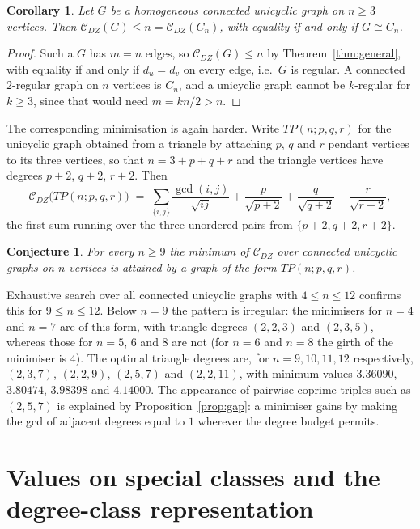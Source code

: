 \documentclass[11pt,a4paper]{article}
\theoremstyle{plain}
\newtheorem{corollary}[theorem]{Corollary}
\newtheorem{conjecture}[theorem]{Conjecture}
\theoremstyle{definition}
\theoremstyle{remark}
\newcommand{\CDZ}{\mathcal{C}_{DZ}}
\newcommand{\gcdd}{\operatorname{gcd}}
\begin{document}
\begin{corollary}
\label{cor:unicyclic}
Let $G$ be a homogeneous connected unicyclic graph on $n\ge3$ vertices. Then
$\CDZ(G)\le n=\CDZ(C_n)$, with equality if and only if $G\cong C_n$.
\end{corollary}

\begin{proof}
Such a $G$ has $m=n$ edges, so $\CDZ(G)\le n$ by Theorem~\ref{thm:general}, with
equality if and only if $d_u=d_v$ on every edge, i.e.\ $G$ is regular. A
connected $2$-regular graph on $n$ vertices is $C_n$, and a unicyclic graph
cannot be $k$-regular for $k\ge3$, since that would need $m=kn/2>n$.
\end{proof}

The corresponding minimisation is again harder. Write $T\!P(n;p,q,r)$ for the
unicyclic graph obtained from a triangle by attaching $p$, $q$ and $r$ pendant
vertices to its three vertices, so that $n=3+p+q+r$ and the triangle vertices
have degrees $p+2$, $q+2$, $r+2$. Then
\[
  \CDZ\bigl(T\!P(n;p,q,r)\bigr)
  \;=\;\sum_{\{i,j\}}\frac{\gcdd(i,j)}{\sqrt{ij}}
  +\frac{p}{\sqrt{p+2}}+\frac{q}{\sqrt{q+2}}+\frac{r}{\sqrt{r+2}},
\]
the first sum running over the three unordered pairs from $\{p+2,q+2,r+2\}$.

\begin{conjecture}
\label{conj:unicyclic}
For every $n\ge9$ the minimum of $\CDZ$ over connected unicyclic graphs on $n$
vertices is attained by a graph of the form $T\!P(n;p,q,r)$.
\end{conjecture}

Exhaustive search over all connected unicyclic graphs with $4\le n\le12$ confirms
this for $9\le n\le12$. Below $n=9$ the pattern is irregular: the minimisers
for $n=4$ and $n=7$ are of this form, with triangle degrees $(2,2,3)$ and
$(2,3,5)$, whereas those for $n=5$, $6$ and $8$ are not (for $n=6$ and $n=8$ the
girth of the minimiser is $4$). The optimal
triangle degrees are, for $n=9,10,11,12$ respectively, $(2,3,7)$, $(2,2,9)$,
$(2,5,7)$ and $(2,2,11)$, with minimum values $3.36090$, $3.80474$, $3.98398$
and $4.14000$. The appearance of pairwise coprime triples such as $(2,5,7)$ is
explained by Proposition~\ref{prop:gap}: a minimiser gains by making the gcd of
adjacent degrees equal to $1$ wherever the degree budget permits.

\section{Values on special classes and the degree-class representation}
\label{sec:classes}
\end{document}
